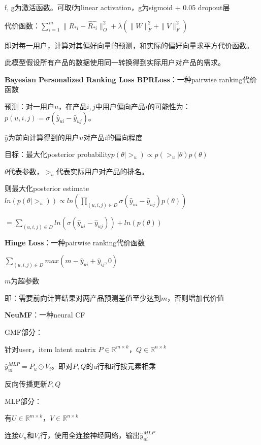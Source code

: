 \documentclass[UTF8]{ctexart}
\begin{document}
  \quad \quad f, g为激活函数。可取f为linear activation，g为sigmoid + 0.05 dropout层

  \quad 代价函数：$\sum_{i=1}^{m}\|R_{*i} - \hat{R_{*i}}\|_O^2 + \lambda (\|W\|_F^2 + \|V\|_F^2)$

  \quad \quad 即对每一用户，计算对其偏好向量的预测，和实际的偏好向量求平方代价函数。

  \quad \quad 此模型假设所有产品的数据使用同一转换得到实际用户对产品的需求。

  \textbf{Bayesian Personalized Ranking Loss BPRLoss}：一种pairwise ranking代价函数

  \quad 预测：对一用户$u$，在产品$i, j$中用户偏向产品$i$的可能性为：$p(u, i, j) = \sigma(\hat{y}_{ui} - \hat{y}_{uj})$。
  
  \quad \quad $\hat{y}$为前向计算得到的用户$u$对产品$i$的偏向程度

  \quad 目标：最大化posterior probability$p(\theta | >_u) \propto p(>_u | \theta)p(\theta)$

  \quad \quad $\theta$代表参数，$>_u$代表实际用户对产品的排名。

  \quad \quad 则最大化posterior estimate$ln(p(\theta | >_u)) \propto ln(\prod_{(u, i, j) \in D} \sigma(\hat{y}_{ui} - \hat{y}_{uj})p(\theta))$

  \quad \quad \quad $ = \sum_{(u, i, j) \in D} ln(\sigma(\hat{y}_{ui} - \hat{y}_{uj})) + ln(p(\theta))$

  \textbf{Hinge Loss}：一种pairwise ranking代价函数

  \quad $\sum_{(u, i, j) \in D} max(m - \hat{y}_{ui} + \hat{y}_{ij}, 0)$

  \quad \quad $m$为超参数

  \quad \quad 即：需要前向计算结果对两产品预测差值至少达到$m$，否则增加代价值

  \textbf{NeuMF}：一种neural CF

  \quad GMF部分：

  \quad \quad 针对user，item latent matrix $P \in \mathbb{R}^{m \times k}$，$Q \in \mathbb{R}^{n \times k}$

  \quad \quad $\hat{y}_{ui}^{MLP} = P_u \odot V_i$。即对$P, Q$的u行和i行按元素相乘
  
  \quad \quad 反向传播更新$P, Q$

  \quad MLP部分：

  \quad \quad 有$U \in \mathbb{R}^{m \times k}$，$V \in \mathbb{R}^{n \times k}$

  \quad \quad 连接$U_u$和$V_i$行，使用全连接神经网络，输出$\hat{y}_{ui}^{MLP}$
\end{document}
